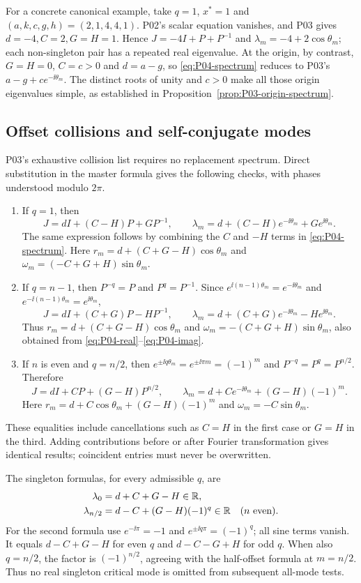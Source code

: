 For a concrete canonical example, take $q=1$, $x^*=1$ and
$(a,k,c,g,h)=(2,1,4,4,1)$. P02's scalar equation vanishes,
and P03 gives $d=-4,C=2,G=H=1$. Hence
$J=-4I+P+P^{-1}$ and $\lambda_m=-4+2\cos\theta_m$;
each non-singleton pair has a repeated real eigenvalue.
At the origin, by contrast, $G=H=0$, $C=c>0$ and $d=a-g$,
so \eqref{eq:P04-spectrum} reduces to P03's
$a-g+ce^{-\ii\theta_m}$. The distinct roots of unity and $c>0$
make all those origin eigenvalues simple, as established in
Proposition~\ref{prop:P03-origin-spectrum}.

\subsection{Offset collisions and self-conjugate modes}
\label{slot:P04-extra-1}

P03's exhaustive collision list requires no replacement spectrum.
Direct substitution in the master formula gives the following
checks, with phases understood modulo $2\pi$.
\begin{enumerate}[label=(\roman*),leftmargin=*]
\item If $q=1$, then
\[
 J=dI+(C-H)P+GP^{-1},\qquad
 \lambda_m=d+(C-H)e^{-\ii\theta_m}+Ge^{\ii\theta_m}.
\]
The same expression follows by combining the $C$ and $-H$ terms
in \eqref{eq:P04-spectrum}. Here
$r_m=d+(C+G-H)\cos\theta_m$ and
$\omega_m=(-C+G+H)\sin\theta_m$.
\item If $q=n-1$, then $P^{-q}=P$ and $P^q=P^{-1}$.
Since $e^{\ii(n-1)\theta_m}=e^{-\ii\theta_m}$ and
$e^{-\ii(n-1)\theta_m}=e^{\ii\theta_m}$,
\[
 J=dI+(C+G)P-HP^{-1},\qquad
 \lambda_m=d+(C+G)e^{-\ii\theta_m}-He^{\ii\theta_m}.
\]
Thus $r_m=d+(C+G-H)\cos\theta_m$ and
$\omega_m=-(C+G+H)\sin\theta_m$, also obtained from
\eqref{eq:P04-real}--\eqref{eq:P04-imag}.
\item If $n$ is even and $q=n/2$, then
$e^{\pm\ii q\theta_m}=e^{\pm\ii\pi m}=(-1)^m$ and
$P^{-q}=P^q=P^{n/2}$. Therefore
\[
 J=dI+CP+(G-H)P^{n/2},\qquad
 \lambda_m=d+Ce^{-\ii\theta_m}+(G-H)(-1)^m.
\]
Here $r_m=d+C\cos\theta_m+(G-H)(-1)^m$ and
$\omega_m=-C\sin\theta_m$.
\end{enumerate}
These equalities include cancellations such as $C=H$ in the first
case or $G=H$ in the third. Adding contributions before or after
Fourier transformation gives identical results; coincident entries
must never be overwritten.

The singleton formulas, for every admissible $q$, are
\begin{align}
 \lambda_0&=d+C+G-H\in\mathbb{R},\label{eq:P04-zero-mode}\\
 \lambda_{n/2}&=d-C+(G-H)(-1)^q\in\mathbb{R}
       \quad(n\text{ even}).\label{eq:P04-half-mode}
\end{align}
For the second formula use $e^{-\ii\pi}=-1$ and
$e^{\pm\ii q\pi}=(-1)^q$; all sine terms vanish.
It equals $d-C+G-H$ for even $q$ and $d-C-G+H$ for odd $q$.
When also $q=n/2$, the factor is $(-1)^{n/2}$, agreeing with the
half-offset formula at $m=n/2$. Thus no real singleton critical
mode is omitted from subsequent all-mode tests.

